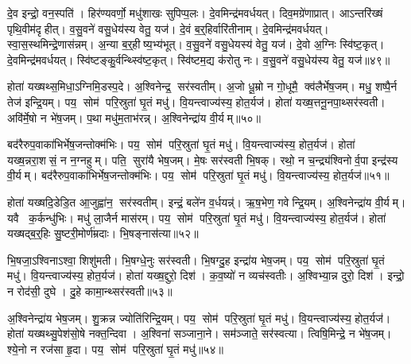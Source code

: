 दे॒व इन्द्रो॒ वन॒स्पति॑। हिर॑ण्यवर्णो॒ मधु॑शाखः सुपिप्प॒लः। दे॒वमिन्द्र॑मवर्धयत्। दिव॒मग्रे॑णाप्रात्। आऽन्तरि॑ख्षं पृथि॒वीम॑दृहीत्। व॒सु॒वने॑ वसु॒धेय॑स्य वेतु॒ यज॑। दे॒वं ब॒र्॒हिर्वारि॑तीनाम्। दे॒वमिन्द्र॑मवर्धयत्। स्वा॒स॒स्थमिन्द्रे॒णास॑न्नम्। अ॒न्या ब॒र्॒हीष्य॒भ्य॑भूत्। व॒सु॒वने॑ वसु॒धेयस्य॑ वेतु॒ यज॑। दे॒वो अ॒ग्निः स्वि॑ष्ट॒कृत्। दे॒वमिन्द्र॑मवर्धयत्। स्वि॑ष्टङ्कु॒र्वन्थ्स्वि॑ष्ट॒कृत्। स्वि॑ष्टम॒द्य क॑रोतु नः। व॒सु॒वने॑ वसु॒धेय॑स्य वेतु॒ यज॑॥४९॥

होता॑ यख्षथ्स॒मिधा॒ऽग्निमि॒डस्प॒दे। अ॒श्विनेन्द्र॒ सर॑स्वतीम्। अ॒जो धू॒म्रो न गो॒धूमै॒ क्व॑लैर्भेष॒जम्। मधु॒ शष्पै॒र्न तेज॑ इन्द्रि॒यम्। पय॒ सोम॑ परि॒स्रुता॑ घृ॒तं मधु॑। वि॒यन्त्वाज्य॑स्य॒ होत॒र्यज॑। होता॑ यख्ष॒त्तनू॒नपा॒थ्सर॑स्वती। अवि॑र्मे॒षो न भे॑ष॒जम्। प॒था मधु॑म॒ताभ॑रन्न्। अ॒श्विनेन्द्रा॑य वी॒र्यम्॥५०॥

बद॑रैरुप॒वाका॑भिर्भेष॒जन्तोक्म॑भिः। पय॒ सोम॑ परि॒स्रुता॑ घृ॒तं मधु॑। वि॒यन्त्वाज्य॑स्य॒ होत॒र्यज॑। होता॑ यख्ष॒न्नरा॒शसं॒ न न॒ग्नहुम्। पति॒ सुरा॑यै भेष॒जम्। मे॒षः सर॑स्वती भि॒षक्। रथो॒ न च॒न्द्र्य॑श्विनोर्व॒पा इन्द्र॑स्य वी॒र्यम्। बद॑रैरुप॒वाका॑भिर्भेष॒जन्तोक्म॑भिः। पय॒ सोम॑ परि॒स्रुता॑ घृ॒तं मधु॑। वि॒यन्त्वाज्य॑स्य॒ होत॒र्यज॑॥५१॥

होता॑ यख्षदि॒डेडि॒त आ॒जुह्वा॑न॒ सर॑स्वतीम्। इन्द्रं॒ बले॑न व॒र्धयन्न्॑। ऋ॒ष॒भेण॒ गवेन्द्रि॒यम्। अ॒श्विनेन्द्रा॑य वी॒र्यम्। यवै क॒र्कन्धु॑भिः। मधु॑ ला॒जैर्न मास॑रम्। पय॒ सोम॑ परि॒स्रुता॑ घृ॒तं मधु॑। वि॒यन्त्वाज्य॑स्य॒ होत॒र्यज॑। होता॑ यख्षद्ब॒र्॒हिः सु॒ष्टरी॒मोर्ण॑म्रदाः। भि॒षङ्नास॑त्या॥५२॥

भि॒षजा॒ऽश्विनाऽश्वा॒ शिशु॑मती। भि॒षग्धे॒नुः सर॑स्वती। भि॒षग्दु॒ह इन्द्रा॑य भेष॒जम्। पय॒ सोम॑ परि॒स्रुता॑ घृ॒तं मधु॑। वि॒यन्त्वाज्य॑स्य॒ होत॒र्यज॑। होता॑ यख्ष॒द्दुरो॒ दिश॑। क॒व॒ष्यो॑ न व्यच॑स्वतीः। अ॒श्विभ्या॒न्न दुरो॒ दिश॑। इन्द्रो॒ न रोद॑सी॒ दुघे। दु॒हे कामा॒न्थ्सर॑स्वती॥५३॥

अ॒श्विनेन्द्रा॑य भेष॒जम्। शु॒क्रन्न ज्योति॑रिन्द्रि॒यम्। पय॒ सोम॑ परि॒स्रुता॑ घृ॒तं मधु॑। वि॒यन्त्वाज्य॑स्य॒ होत॒र्यज॑। होता॑ यख्षथ्सु॒पेश॑सो॒षे नक्त॒न्दिवा। अ॒श्विना॑ सञ्जाना॒ने। सम॑ञ्जाते॒ सर॑स्वत्या। त्विषि॒मिन्द्रे॒ न भे॑ष॒जम्। श्ये॒नो न रज॑सा हृ॒दा। पय॒ सोम॑ परि॒स्रुता॑ घृ॒तं मधु॑॥५४॥

